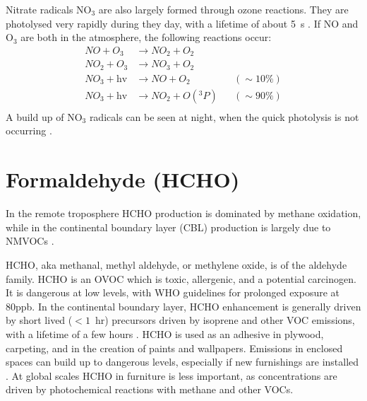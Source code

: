     Nitrate radicals NO$_3$ are also largely formed through ozone reactions.
    They are photolysed very rapidly during they day, with a lifetime of about 5~s \citep{Atkinson2000}.
    If NO and O$_3$ are both in the atmosphere, the following reactions \citep{Atkinson2000} occur:
    \begin{align*}
      NO + O_3         & \to NO_2 + O_2      && \\%
      NO_2 + O_3       & \to NO_3 + O_2      && \\%
      NO_3 + \text{hv} & \to NO + O_2        && (\sim 10\%) \\%
      NO_3 + \text{hv} & \to NO_2 + O({}^3P) && (\sim 90\%) \\%
    \end{align*}
    A build up of NO$_3$ radicals can be seen at night, when the quick photolysis is not occurring \citep{Atkinson2000,Brown2009}.

\section{Formaldehyde (HCHO)}
  \label{LR:O3andAQ:HCHO}
  
  In the remote troposphere HCHO production is dominated by methane oxidation, while in the continental boundary layer (CBL) production is largely due to NMVOCs \citep{Abbot2003, Kefauver2014}.
  
  HCHO, aka methanal, methyl aldehyde, or methylene oxide, is of the aldehyde family.
  HCHO is an OVOC which is toxic, allergenic, and a potential carcinogen. 
  It is dangerous at low levels, with WHO guidelines for prolonged exposure at 80ppb.
  In the continental boundary layer, HCHO enhancement is generally driven by short lived ($<1$~hr) precursors driven by isoprene and other VOC emissions, with a lifetime of a few hours \citep{Kefauver2014}.
  HCHO is used as an adhesive in plywood, carpeting, and in the creation of paints and wallpapers.
  Emissions in enclosed spaces can build up to dangerous levels, especially if new furnishings are installed \citep{Davenport2015}.
  At global scales HCHO in furniture is less important, as concentrations are driven by photochemical reactions with methane and other VOCs.
  

